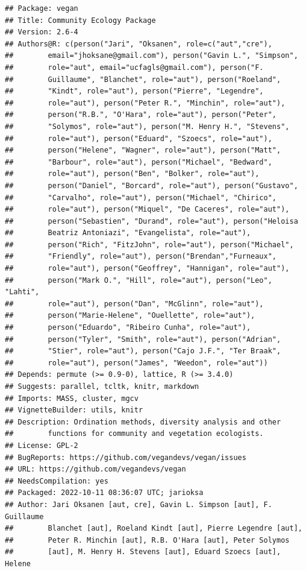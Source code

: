\documentclass[
]{article}
\begin{document}
\begin{verbatim}
## Package: vegan
## Title: Community Ecology Package
## Version: 2.6-4
## Authors@R: c(person("Jari", "Oksanen", role=c("aut","cre"),
##        email="jhoksane@gmail.com"), person("Gavin L.", "Simpson",
##        role="aut", email="ucfagls@gmail.com"), person("F.
##        Guillaume", "Blanchet", role="aut"), person("Roeland",
##        "Kindt", role="aut"), person("Pierre", "Legendre",
##        role="aut"), person("Peter R.", "Minchin", role="aut"),
##        person("R.B.", "O'Hara", role="aut"), person("Peter",
##        "Solymos", role="aut"), person("M. Henry H.", "Stevens",
##        role="aut"), person("Eduard", "Szoecs", role="aut"),
##        person("Helene", "Wagner", role="aut"), person("Matt",
##        "Barbour", role="aut"), person("Michael", "Bedward",
##        role="aut"), person("Ben", "Bolker", role="aut"),
##        person("Daniel", "Borcard", role="aut"), person("Gustavo",
##        "Carvalho", role="aut"), person("Michael", "Chirico",
##        role="aut"), person("Miquel", "De Caceres", role="aut"),
##        person("Sebastien", "Durand", role="aut"), person("Heloisa
##        Beatriz Antoniazi", "Evangelista", role="aut"),
##        person("Rich", "FitzJohn", role="aut"), person("Michael",
##        "Friendly", role="aut"), person("Brendan","Furneaux",
##        role="aut"), person("Geoffrey", "Hannigan", role="aut"),
##        person("Mark O.", "Hill", role="aut"), person("Leo", "Lahti",
##        role="aut"), person("Dan", "McGlinn", role="aut"),
##        person("Marie-Helene", "Ouellette", role="aut"),
##        person("Eduardo", "Ribeiro Cunha", role="aut"),
##        person("Tyler", "Smith", role="aut"), person("Adrian",
##        "Stier", role="aut"), person("Cajo J.F.", "Ter Braak",
##        role="aut"), person("James", "Weedon", role="aut"))
## Depends: permute (>= 0.9-0), lattice, R (>= 3.4.0)
## Suggests: parallel, tcltk, knitr, markdown
## Imports: MASS, cluster, mgcv
## VignetteBuilder: utils, knitr
## Description: Ordination methods, diversity analysis and other
##        functions for community and vegetation ecologists.
## License: GPL-2
## BugReports: https://github.com/vegandevs/vegan/issues
## URL: https://github.com/vegandevs/vegan
## NeedsCompilation: yes
## Packaged: 2022-10-11 08:36:07 UTC; jarioksa
## Author: Jari Oksanen [aut, cre], Gavin L. Simpson [aut], F. Guillaume
##        Blanchet [aut], Roeland Kindt [aut], Pierre Legendre [aut],
##        Peter R. Minchin [aut], R.B. O'Hara [aut], Peter Solymos
##        [aut], M. Henry H. Stevens [aut], Eduard Szoecs [aut], Helene

\end{verbatim}
\end{document}
